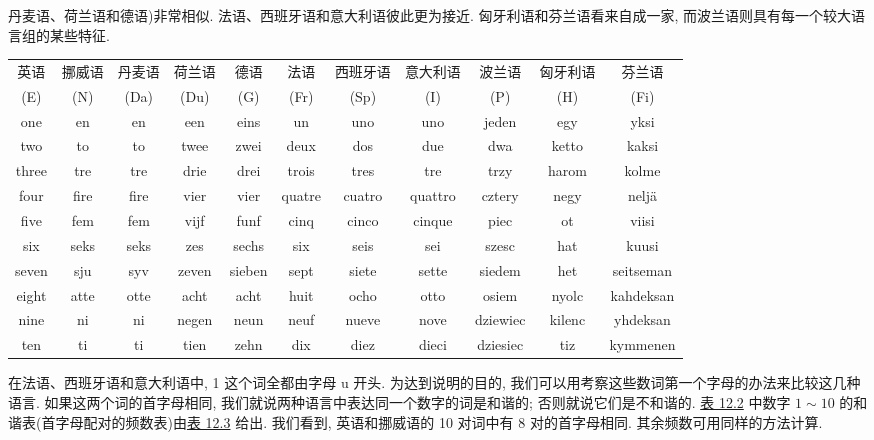 
丹麦语、荷兰语和德语)非常相似. 法语、西班牙语和意大利语彼此更为接近. 匈牙利语和芬兰语看来自成一家, 而波兰语则具有每一个较大语言组的某些特征.

\begin{mvtable}
\label{tab:12.2}
\footnotesize
\begin{tabular}{ccccccccccc}
\toprule
英语 & 挪威语 & 丹麦语 & 荷兰语 & 德语 & 法语 & 西班牙语 & 意大利语 & 波兰语 & 匈牙利语 & 芬兰语\\
(E) & (N) & (Da) & (Du) & (G) & (Fr) & (Sp) & (I) & (P) & (H) & (Fi)\\
\midrule
one & en & en & een & eins & un & uno & uno & jeden & egy & yksi\\
two & to & to & twee & zwei & deux & dos & due & dwa & ketto & kaksi\\
three & tre & tre & drie & drei & trois & tres & tre & trzy & harom & kolme\\
four & fire & fire & vier & vier & quatre & cuatro & quattro & cztery & negy & neljä\\
five & fem & fem & vijf & funf & cinq & cinco & cinque & piec & ot & viisi\\
six & seks & seks & zes & sechs & six & seis & sei & szesc & hat & kuusi\\
seven & sju & syv & zeven & sieben & sept & siete & sette & siedem & het & seitseman\\
eight & atte & otte & acht & acht & huit & ocho & otto & osiem & nyolc & kahdeksan\\
nine & ni & ni & negen & neun & neuf & nueve & nove & dziewiec & kilenc & yhdeksan\\
ten & ti & ti & tien & zehn & dix & diez & dieci & dziesiec & tiz & kymmenen\\
\bottomrule
\end{tabular}
\end{mvtable}

在法语、西班牙语和意大利语中, 1 这个词全都由字母 u 开头. 为达到说明的目的, 我们可以用考察这些数词第一个字母的办法来比较这几种语言. 如果这两个词的首字母相同, 我们就说两种语言中表达同一个数字的词是和谐的; 否则就说它们是不和谐的. \hyperref[tab:12.2]{表 12.2} 中数字 $1\sim 10$ 的和谐表(首字母配对的频数表)由\hyperref[tab:12.3]{表 12.3} 给出. 我们看到, 英语和挪威语的 10 对词中有 8 对的首字母相同. 其余频数可用同样的方法计算.

